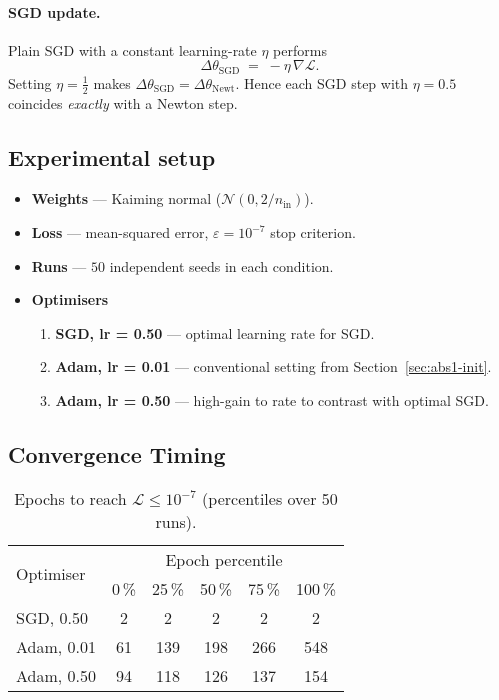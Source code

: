 \paragraph{SGD update.}
Plain SGD with a constant learning-rate $\eta$ performs
\[
    \Delta\theta_{\text{SGD}}
    \;=\;
    -\eta\,\nabla\! \mathcal L.
\]
Setting \(\eta=\tfrac12\) makes \(\Delta\theta_{\text{SGD}} =
\Delta\theta_{\text{Newt}}\).  Hence each SGD step with
\(\eta=0.5\) coincides \emph{exactly} with a Newton step.

\subsection*{Experimental setup}
\begin{itemize}
    \item \textbf{Weights} — Kaiming normal ($\mathcal N(0,2/n_\text{in})$).
    \item \textbf{Loss} — mean-squared error, $\varepsilon=10^{-7}$ stop criterion.
    \item \textbf{Runs} — $50$ independent seeds in each condition.
    \item \textbf{Optimisers}  
        \begin{enumerate}
            \item \textbf{SGD, lr = 0.50} — optimal learning rate for SGD.
            \item \textbf{Adam, lr = 0.01} — conventional setting from Section~\ref{sec:abs1-init}.
            \item \textbf{Adam, lr = 0.50} — high-gain to rate to contrast with optimal SGD.
        \end{enumerate}
\end{itemize}

\subsection*{Convergence Timing}

\begin{table}[h]
\centering
\caption{Epochs to reach $\mathcal{L}\le10^{-7}$ (percentiles over 50 runs).}
\label{tab:abs1-opt-conv}
\begin{tabular}{lccccc}
\toprule
\multirow{2}{*}{Optimiser} &
\multicolumn{5}{c}{Epoch percentile} \\
\cmidrule(lr){2-6}
 & 0\,\% & 25\,\% & 50\,\% & 75\,\% & 100\,\% \\
\midrule
SGD,  0.50 & 2   & 2   & 2   & 2   & 2   \\ 
Adam, 0.01 & 61  & 139 & 198 & 266 & 548 \\
Adam, 0.50 & 94  & 118 & 126 & 137 & 154 \\
\bottomrule
\end{tabular}
\end{table}

